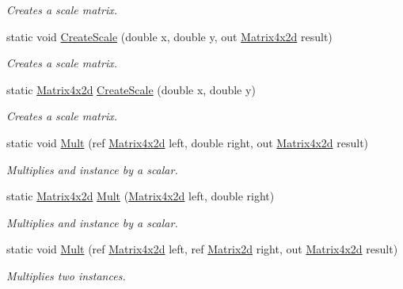 \begin{DoxyCompactItemize}
\begin{DoxyCompactList}\small\item\em Creates a scale matrix. \end{DoxyCompactList}\item 
static void \hyperlink{struct_open_t_k_1_1_matrix4x2d_a2911c9e6b689701e138f755cabe2165e}{Create\-Scale} (double x, double y, out \hyperlink{struct_open_t_k_1_1_matrix4x2d}{Matrix4x2d} result)
\begin{DoxyCompactList}\small\item\em Creates a scale matrix. \end{DoxyCompactList}\item 
static \hyperlink{struct_open_t_k_1_1_matrix4x2d}{Matrix4x2d} \hyperlink{struct_open_t_k_1_1_matrix4x2d_ac269e2c283a4f160a4c0d77b4d9b7c73}{Create\-Scale} (double x, double y)
\begin{DoxyCompactList}\small\item\em Creates a scale matrix. \end{DoxyCompactList}\item 
static void \hyperlink{struct_open_t_k_1_1_matrix4x2d_a946936c013560bf5b905b6de641eaf3e}{Mult} (ref \hyperlink{struct_open_t_k_1_1_matrix4x2d}{Matrix4x2d} left, double right, out \hyperlink{struct_open_t_k_1_1_matrix4x2d}{Matrix4x2d} result)
\begin{DoxyCompactList}\small\item\em Multiplies and instance by a scalar. \end{DoxyCompactList}\item 
static \hyperlink{struct_open_t_k_1_1_matrix4x2d}{Matrix4x2d} \hyperlink{struct_open_t_k_1_1_matrix4x2d_addefd6a381c552af6ba8a33561b23270}{Mult} (\hyperlink{struct_open_t_k_1_1_matrix4x2d}{Matrix4x2d} left, double right)
\begin{DoxyCompactList}\small\item\em Multiplies and instance by a scalar. \end{DoxyCompactList}\item 
static void \hyperlink{struct_open_t_k_1_1_matrix4x2d_a12776fda3e21d465284324c327ffa1a1}{Mult} (ref \hyperlink{struct_open_t_k_1_1_matrix4x2d}{Matrix4x2d} left, ref \hyperlink{struct_open_t_k_1_1_matrix2d}{Matrix2d} right, out \hyperlink{struct_open_t_k_1_1_matrix4x2d}{Matrix4x2d} result)
\begin{DoxyCompactList}\small\item\em Multiplies two instances. \end{DoxyCompactList}\item 

\end{DoxyCompactItemize}

